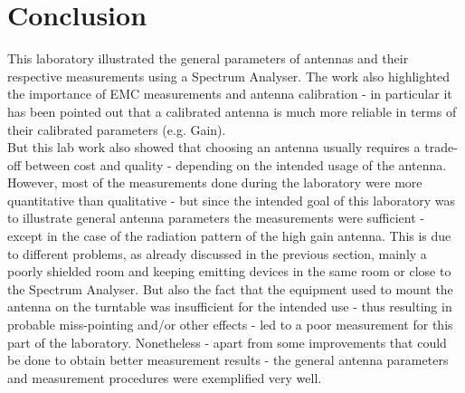 \section{Conclusion}
This laboratory illustrated the general parameters of antennas and their respective measurements using a Spectrum Analyser. The work also highlighted the importance of EMC measurements and antenna calibration - in particular it has been pointed out that a calibrated antenna is much more reliable in terms of their calibrated parameters (e.g. Gain).\\
But this lab work also showed that choosing an antenna usually requires a trade-off between cost and quality - depending on the intended usage of the antenna.\\
However, most of the measurements done during the laboratory were more quantitative than qualitative - but since the intended goal of this laboratory was to illustrate general antenna parameters the measurements were sufficient - except in the case of the radiation pattern of the high gain antenna.
This is due to different problems, as already discussed in the previous section, mainly a poorly shielded room and keeping emitting devices in the same room or close to the Spectrum Analyser. But also the fact that the equipment used to mount the antenna on the turntable was insufficient for the intended use - thus resulting in probable miss-pointing and/or other effects - led to a poor measurement for this part of the laboratory.
Nonetheless - apart from some improvements that could be done to obtain better measurement results - the general antenna parameters and measurement procedures were exemplified very well.










